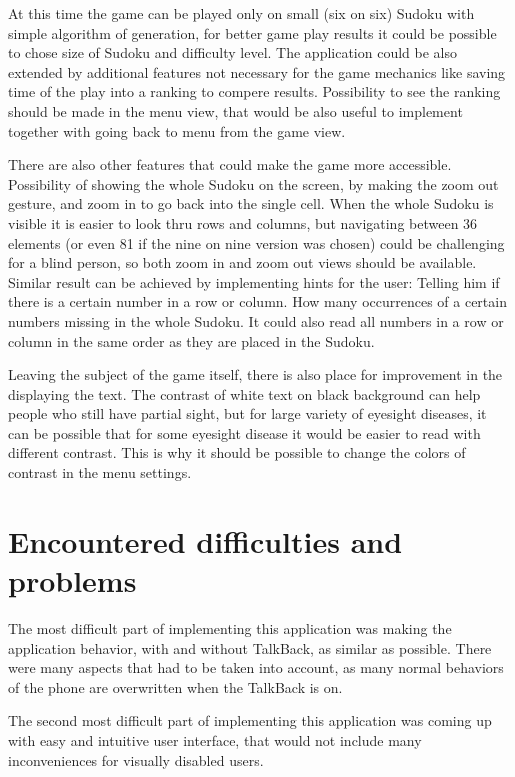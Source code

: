 \documentclass[a4paper,twoside,12pt]{book}
\begin{document}
\par At this time the game can be played only on small (six on six) Sudoku with simple algorithm of generation, for better game play results it could be possible to chose size of Sudoku and difficulty level. The application could be also extended by additional features not necessary for the game mechanics like saving time of the play into a ranking to compere results. Possibility to see the ranking should be made in the menu view, that would be also useful to implement together with going back to menu from the game view.
\par There are also other features that could make the game more accessible. Possibility of showing the whole Sudoku on the screen, by making the zoom out gesture, and zoom in to go back into the single cell. When the whole Sudoku is visible it is easier to look thru rows and columns, but navigating between 36 elements (or even 81 if the nine on nine version was chosen) could be challenging for a blind person, so both zoom in and zoom out views should be available. Similar result can be achieved by implementing hints for the user: Telling him if there is a certain number in a row or column. How many occurrences of a certain numbers missing in the whole Sudoku. It could also read all numbers in a row or column in the same order as they are placed in the Sudoku.
\par Leaving the subject of the game itself, there is also place for improvement in the displaying the text. The contrast of white text on black background can help people who still have partial sight, but for large variety of eyesight diseases, it can be possible that for some eyesight disease it would be easier to read with different contrast. This is why it should be possible to change the colors of contrast in the menu settings.

\section{Encountered difficulties and problems}

\par The most difficult part of implementing this application was making the application behavior, with and without TalkBack, as similar as possible. There were many aspects that had to be taken into account, as many normal behaviors of the phone are overwritten when the TalkBack is on.
\par The second most difficult part of implementing this application was coming up with easy and intuitive user interface, that would not include many inconveniences for visually disabled users.
\end{document}
